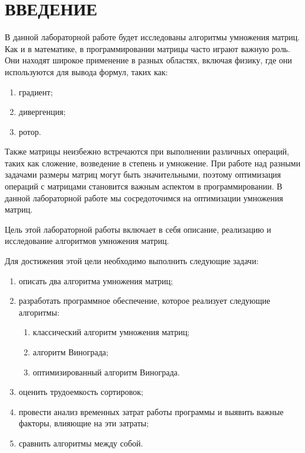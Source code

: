 \chapter*{ВВЕДЕНИЕ}


В данной лабораторной работе будет исследованы алгоритмы умножения матриц. Как и в математике, в программировании матрицы часто играют важную роль. Они находят широкое применение в разных областях, включая физику, где они используются для вывода формул, таких как:
\begin{enumerate}
	\item градиент;
	\item дивергенция;
	\item ротор. \cite{mat_usage}
\end{enumerate}

Также матрицы неизбежно встречаются при выполнении различных операций, таких как сложение, возведение в степень и умножение. При работе над разными задачами размеры матриц могут быть значительными, поэтому оптимизация операций с матрицами становится важным аспектом в программировании. В данной лабораторной работе мы сосредоточимся на оптимизации умножения матриц.

Цель этой лабораторной работы включает в себя описание, реализацию и исследование алгоритмов умножения матриц.

Для достижения этой цели необходимо выполнить следующие задачи:
\begin{enumerate}
	\item описать два алгоритма умножения матриц;
	\item разработать программное обеспечение, которое реализует следующие алгоритмы:
	\begin{enumerate}
		\item классический алгоритм умножения матриц;
		\item алгоритм Винограда;
		\item оптимизированный алгоритм Винограда.
	\end{enumerate}
	\item оценить трудоемкость сортировок;
	\item провести анализ временных затрат работы программы и выявить важные факторы, влияющие на эти затраты;
	\item сравнить алгоритмы между собой.
\end{enumerate}
